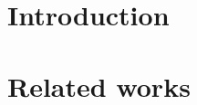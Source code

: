 \documentclass[sigconf, screen, review]{acmart}
\begin{document}
\maketitle






\section{Introduction}
\section{Related works}
\end{document}
